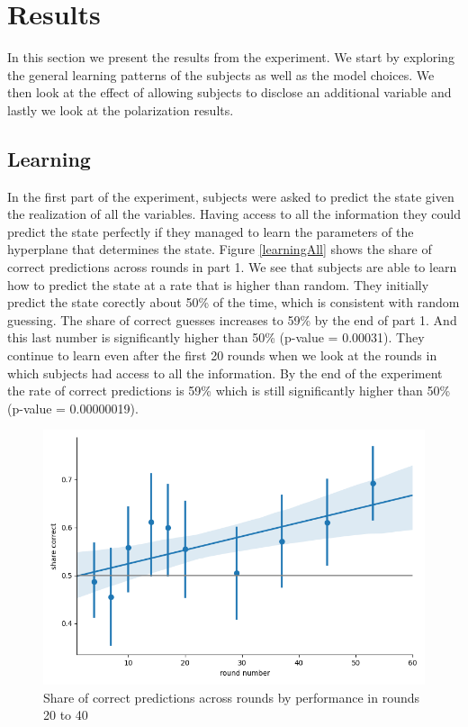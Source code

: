 \documentclass[
  12pt,
]{article}
\begin{document}
\hypertarget{results}{%
\section{Results}\label{results}}

In this section we present the results from the experiment. We start by
exploring the general learning patterns of the subjects as well as the
model choices. We then look at the effect of allowing subjects to
disclose an additional variable and lastly we look at the polarization
results.

\subsection{Learning}

In the first part of the experiment, subjects were asked to predict the
state given the realization of all the variables. Having access to all
the information they could predict the state perfectly if they managed
to learn the parameters of the hyperplane that determines the state.
Figure \ref{learningAll} shows the share of correct predictions across
rounds in part 1. We see that subjects are able to learn how to predict
the state at a rate that is higher than random. They initially predict
the state corectly about 50\% of the time, which is consistent with
random guessing. The share of correct guesses increases to 59\% by the
end of part 1. And this last number is significantly higher than 50\%
(p-value = 0.00031). They continue to learn even after the first 20
rounds when we look at the rounds in which subjects had access to all
the information. By the end of the experiment the rate of correct
predictions is 59\% which is still significantly higher than 50\%
(p-value = 0.00000019).

\begin{figure}

{\centering \includegraphics[width=0.5\linewidth]{../computed_objects/figures/learning_all} 

}

\caption{\label{learningAll} Share of correct predictions across rounds by performance in rounds 20 to 40}\label{fig:learningAll}
\end{figure}
\end{document}
